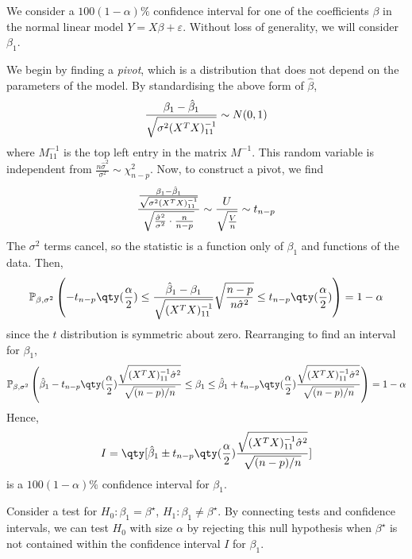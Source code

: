 \begin{example}
	We consider a $100(1-\alpha)\%$ confidence interval for one of the coefficients $\beta$ in the normal linear model $Y = X\beta + \varepsilon$.
	Without loss of generality, we will consider $\beta_1$.

	We begin by finding a \textit{pivot}, which is a distribution that does not depend on the parameters of the model.
	By standardising the above form of $\hat \beta$,
	\begin{align*}
		\frac{\beta_1 - \hat \beta_1}{\sqrt{\sigma^2(X^T X)^{-1}_{11}}} \sim N(0,1)
	\end{align*}
	where $M^{-1}_{11}$ is the top left entry in the matrix $M^{-1}$.
	This random variable is independent from $\frac{n\hat \sigma^2}{\sigma^2} \sim \chi^2_{n-p}$.
	Now, to construct a pivot, we find
	\begin{align*}
		\frac{\frac{\beta_1 - \hat \beta_1}{\sqrt{\sigma^2(X^T X)^{-1}_{11}}}}{\sqrt{\frac{\hat \sigma^2}{\sigma^2} \cdot \frac{n}{n-p}}} \sim \frac{U}{\sqrt{\frac{V}{n}}} \sim t_{n-p}
	\end{align*}
	The $\sigma^2$ terms cancel, so the statistic is a function only of $\beta_1$ and functions of the data.
	Then,
	\begin{align*}
		\psub{\beta,\sigma^2}{ -t_{n-p}\qty(\frac{\alpha}{2}) \leq \frac{\hat \beta_1 - \beta_1}{\sqrt{(X^\tran X)^{-1}_{11}}} \sqrt{\frac{n-p}{n\hat\sigma^2}} \leq t_{n-p}\qty(\frac{\alpha}{2}) } = 1-\alpha
	\end{align*}
	since the $t$ distribution is symmetric about zero.
	Rearranging to find an interval for $\beta_1$,
	\begin{align*}
		\psub{\beta,\sigma^2}{
			\hat \beta_1 - t_{n-p}\qty(\frac{\alpha}{2}) \frac{\sqrt{(X^\tran X)^{-1}_{11} \hat\sigma^2}}{\sqrt{(n-p)/n}}
			\leq \beta_1 \leq
			\hat \beta_1 + t_{n-p}\qty(\frac{\alpha}{2}) \frac{\sqrt{(X^\tran X)^{-1}_{11} \hat\sigma^2}}{\sqrt{(n-p)/n}}
		} = 1-\alpha
	\end{align*}
	Hence,
	\begin{align*}
		I = \qty[\hat \beta_1 \pm t_{n-p}\qty(\frac{\alpha}{2}) \frac{\sqrt{(X^\tran X)^{-1}_{11} \hat \sigma^2}}{\sqrt{(n-p)/n}} ]
	\end{align*}
	is a $100(1-\alpha)\%$ confidence interval for $\beta_1$.

	Consider a test for $H_0 \colon \beta_1 = \beta^\star$, $H_1 \colon \beta_1 \neq \beta^\star$.
	By connecting tests and confidence intervals, we can test $H_0$ with size $\alpha$ by rejecting this null hypothesis when $\beta^\star$ is not contained within the confidence interval $I$ for $\beta_1$.


\end{example}

